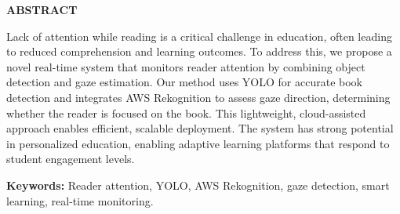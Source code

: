 \newpage


\begin{center}
  \Large\textbf{ABSTRACT}
\end{center}

\begin{justify}

\linespread{1.5}
\normalsize Lack of attention while reading is a critical challenge in education, often leading to reduced comprehension and learning outcomes. To address this, we propose a novel real-time system that monitors reader attention by combining object detection and gaze estimation. Our method uses YOLO for accurate book detection and integrates AWS Rekognition to assess gaze direction, determining whether the reader is focused on the book. This lightweight, cloud-assisted approach enables efficient, scalable deployment. The system has strong potential in personalized education, enabling adaptive learning platforms that respond to student engagement levels.
\vspace{1cm}
\begin{justify}
  \textbf{Keywords:}  Reader attention, YOLO, AWS Rekognition, gaze detection, smart learning, real-time monitoring. 
\end{justify}
\end{justify}